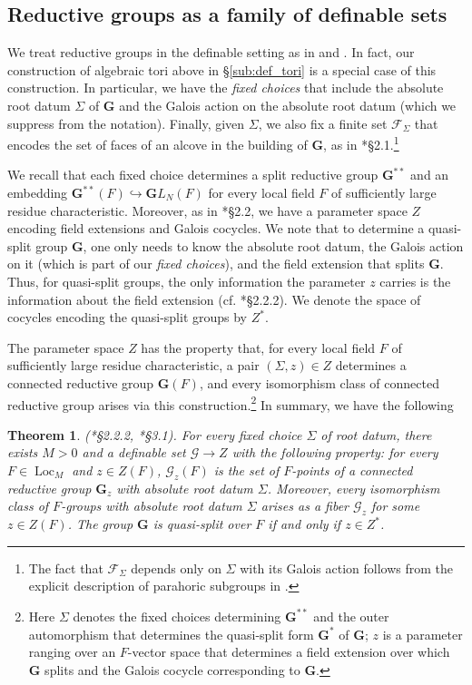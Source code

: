 \documentclass{amsart}
\newcommand{\cF}{\mathcal{F}}
\newcommand{\cG}{\mathcal{G}}
\DeclareMathOperator{\loc}{Loc}
\newcommand{\bG}{\mathbf{G}}
\theoremstyle{plain}
\newtheorem{theorem}[thm]{Theorem}
\theoremstyle{definition}
\begin{document}
\subsection{Reductive groups as a family of definable sets}
We treat reductive groups in the definable setting as in \cite{hales:transfert} and \cite{CGH-2}.
In fact, our construction of algebraic tori above in \S \ref{sub:def_tori} is a special case of this construction.
In particular, we have the \emph{fixed choices} that include the absolute root datum $\Sigma$ of $\bG$
and the Galois action on the absolute root datum (which we suppress from the notation).
Finally, given $\Sigma$, we also fix a finite set $\cF_\Sigma$ that encodes
the set of faces of an alcove in the building of $\bG$, as in \cite{hales:transfert}*{\S 2.1}.\footnote{The fact that
$\cF_\Sigma$ depends only on $\Sigma$ with its Galois action follows from the explicit description of parahoric subgroups in \cite{gross:parahorics}.}  

We recall that each  fixed choice determines  a split reductive group $\bG^{\ast\ast}$ and an embedding 
$\bG^{\ast\ast}(F)\hookrightarrow {\mathbf GL}_N(F)$ for every local field $F$ of sufficiently large residue characteristic.  
Moreover, as in \cite{hales:transfert}*{\S 2.2}, we have a parameter space $Z$ encoding field extensions and Galois cocycles. We note that to determine a quasi-split group $\bG$, one only needs to know the absolute root datum, the Galois action on it (which is part of our \emph{fixed choices}), and the field extension that splits $\bG$. Thus, for quasi-split groups, the only information the parameter $z$ carries is the information about the field extension (cf. \cite{hales:transfert}*{\S 2.2.2}). 
We denote the space of cocycles encoding the quasi-split groups by $Z^\ast$. 

The parameter space  $Z$ has the property that, for every local field $F$ of sufficiently large residue characteristic, a pair 
$(\Sigma, z)\in Z$ determines a connected reductive group $\bG(F)$, and every
isomorphism class of connected reductive group arises via this construction.\footnote{Here
$\Sigma$ denotes the fixed choices determining $\bG^{\ast\ast}$ and the outer automorphism that determines the quasi-split form $\bG^\ast$ of $\bG$;  $z$ is a parameter ranging over an
$F$-vector space that determines a field extension over which $\bG$ splits and the Galois cocycle corresponding to $\bG$.} 
In summary, we have the following 
\begin{theorem}\label{thm:def_groups}(\cite{hales:transfert}*{\S 2.2.2}, \cite{CGH-2}*{\S 3.1}). 
 For every fixed choice $\Sigma$ of root datum, there exists $M>0$ and a definable set $\cG \to Z$ with the following property:
for every $F\in \loc_M$ and $z \in Z(F)$, ${\cG_z}(F)$ is the set of $F$-points of a connected reductive group
$\bG_z$ with absolute root datum $\Sigma$.  Moreover, every isomorphism class of $F$-groups with absolute root datum 
$\Sigma$ arises as a fiber $\cG_z$ for some $z\in Z(F)$.  
The group $\bG$ is quasi-split over $F$ if and only if $z\in Z^\ast$. 
\end{theorem}
\end{document}
